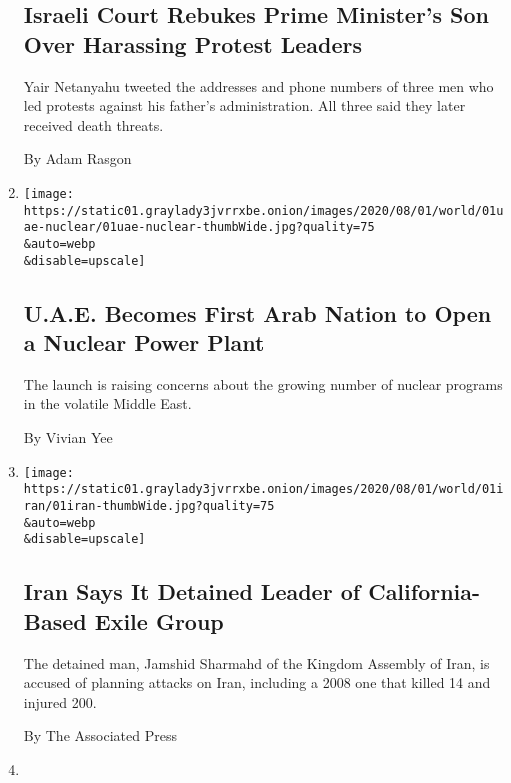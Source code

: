 \begin{enumerate}
{  \subsection{Israeli Court Rebukes Prime Minister's Son Over Harassing
  Protest
  Leaders}\label{israeli-court-rebukes-prime-ministers-son-over-harassing-protest-leaders}}

  Yair Netanyahu tweeted the addresses and phone numbers of three men
  who led protests against his father's administration. All three said
  they later received death threats.

  By Adam Rasgon
\item
  \href{/2020/08/01/world/middleeast/uae-nuclear-Barakah.html}{}

  \texttt{[image: https://static01.graylady3jvrrxbe.onion/images/2020/08/01/world/01uae-nuclear/01uae-nuclear-thumbWide.jpg?quality=75\\\&auto=webp\\\&disable=upscale]}

  \hypertarget{uae-becomes-first-arab-nation-to-open-a-nuclear-power-plant}{%
  \subsection{U.A.E. Becomes First Arab Nation to Open a Nuclear Power
  Plant}\label{uae-becomes-first-arab-nation-to-open-a-nuclear-power-plant}}

  The launch is raising concerns about the growing number of nuclear
  programs in the volatile Middle East.

  By Vivian Yee
\item
  \href{/2020/08/01/world/middleeast/iran-jamshid-sharmahd-arrested-kingdom-assembly.html}{}

  \texttt{[image: https://static01.graylady3jvrrxbe.onion/images/2020/08/01/world/01iran/01iran-thumbWide.jpg?quality=75\\\&auto=webp\\\&disable=upscale]}

  \hypertarget{iran-says-it-detained-leader-of-california-based-exile-group}{%
  \subsection{Iran Says It Detained Leader of California-Based Exile
  Group}\label{iran-says-it-detained-leader-of-california-based-exile-group}}

  The detained man, Jamshid Sharmahd of the Kingdom Assembly of Iran, is
  accused of planning attacks on Iran, including a 2008 one that killed
  14 and injured 200.

  By The Associated Press
\item
  \href{/video/world/middleeast/100000007268443/iran-united-states-nuclear-program-negotiation.html}{}


\end{enumerate}
